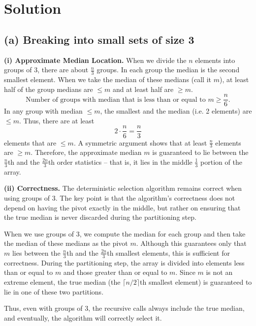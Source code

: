 \documentclass[11pt]{article}
\begin{document}
    \section*{Solution}    
    \subsection*{(a) Breaking into small sets of size 3}
    
    \textbf{(i) Approximate Median Location.}  
    When we divide the \(n\) elements into groups of 3, there are about \(\frac{n}{3}\) groups. In each group the median is the second smallest element. When we take the median of these medians (call it \(m\)), at least half of the group medians are \(\le m\) and at least half are \(\ge m\).  
    \[
    \text{Number of groups with median that is less than or equal to } m \ge \frac{n}{6}.
    \]
    In any group with median \(\le m\), the smallest and the median (i.e. 2 elements) are \(\le m\). Thus, there are at least 
    \[
    2\cdot\frac{n}{6} = \frac{n}{3}
    \]
    elements that are \(\le m\). A symmetric argument shows that at least \(\frac{n}{3}\) elements are \(\ge m\). Therefore, the approximate median \(m\) is guaranteed to lie between the \(\frac{n}{3}\)th and the \(\frac{2n}{3}\)th order statistics – that is, it lies in the middle \(\frac{1}{3}\) portion of the array.
    \medskip
    
    \textbf{(ii) Correctness.}  
    The deterministic selection algorithm remains correct when using groups of 3. The key point is that the algorithm’s correctness does not depend on having the pivot exactly in the middle, but rather on ensuring that the true median is never discarded during the partitioning step. 

    When we use groups of 3, we compute the median for each group and then take the median of these medians as the pivot \(m\). Although this guarantees only that \(m\) lies between the \(\frac{n}{3}\)th and the \(\frac{2n}{3}\)th smallest elements, this is sufficient for correctness. During the partitioning step, the array is divided into elements less than or equal to \(m\) and those greater than or equal to \(m\). Since \(m\) is not an extreme element, the true median (the \(\lceil n/2 \rceil\)th smallest element) is guaranteed to lie in one of these two partitions. 
    
    Thus, even with groups of 3, the recursive calls always include the true median, and eventually, the algorithm will correctly select it.
    \medskip
    
\end{document}
